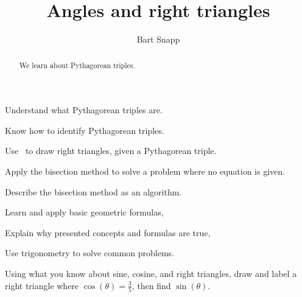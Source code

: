 \documentclass[noauthor,nooutcomes,handout]{ximera}
\title{Angles and right triangles}
\author{Bart Snapp}
\begin{document}
\begin{abstract}
  We learn about Pythagorean triples.
\end{abstract}
\maketitle

\begin{listOutcomes}
\item{Understand what Pythagorean triples are.}
\item{Know how to identify Pythagorean triples.}
\item{Use \snap\ to draw right triangles, given a Pythagorean triple.}
\item{Apply the bisection method to solve a problem where no equation is given.}
\item{Describe the bisection method as an algorithm.}
\end{listOutcomes}
\begin{listObjectives}
 \item Learn and apply basic geometric formulas,
\item Explain why presented concepts and formulas are true,
\item Use trigonometry to solve common problems.
\end{listObjectives}

\begin{question}
 Using what you know about sine, cosine, and right triangles, draw and label a right triangle where $\cos(\theta)=\frac{3}{5}$, then find $\sin(\theta)$.
\end{question}
\mynewpage
\end{document}
